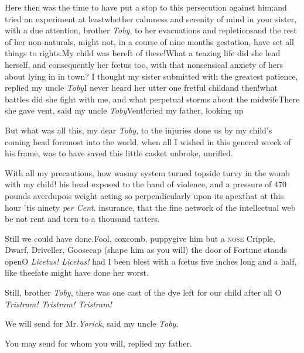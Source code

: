 \documentclass{article}
\begin{document}
\newpage
Here then was the time to have put a stop to this
persecution against him;\tsh and tried an experiment at
least\tsk whether calmness and serenity of mind in your
sister, with a due attention, brother \textit{Toby}, to her
evacuations and repletions\tsk and the rest of her
non-naturals, might not,\break 
in a course of nine months gestation,\break
have set all things to rights.\tsk My child was
bereft of these!\tsk What a teazing life did she lead
herself, and consequently her fœtus too, with that
nonsensical\break
anxiety of hers about lying in in town?\break
I thought my sister submitted with the greatest patience,
replied my uncle \textit{Toby}\break\tsk I never heard her
utter one fretful
child\tsk and then!\@ what battles did she
fight with me, and what perpetual storms\pb
about the midwife\tsk There she gave vent, said my uncle
\textit{Toby}\tsk Vent!\@ cried my father, looking up\tsk

But what was all this, my dear \textit{Toby}, to the
injuries done us by my child’s coming head foremost into the
world, when all I wished in this general wreck of his
frame, was to have saved this little casket unbroke,
unrifled.\tsk

With all my precautions, how was\break my system turned
topside turvy in the womb with my child! his head exposed to
the hand of violence, and a pressure of 470 pounds
averdupois weight acting so perpendicularly upon its
apex\tsk that at this hour ’tis ninety \textit{per Cent}.
insurance, that the fine network of the intellectual web be
not rent and torn to a thousand\break
tatters.

\newpage
\tsk Still we could have done.\tsh Fool,\break 
coxcomb, puppy\tsk give him but a \textsc{nose}\break
\tsh Cripple, Dwarf, Driveller, Goosecap\break
\tsh (shape him as you will) the door of Fortune stands
open\tsk O \textit{Licetus! Licetus!} had I been blest with
a fœtus five inches long and a half, like thee\tsk fate
might have done her worst.

Still, brother \textit{Toby}, there was one cast of the dye
left for our child after all\tsk\break
O \textit{Tristram! Tristram!  Tristram!}

We will send for Mr.\@ \textit{Yorick}, said my uncle \textit{Toby}.

\tsh You may send for whom you will, replied my father.

\newpage
\null\smallskip
\end{document}
